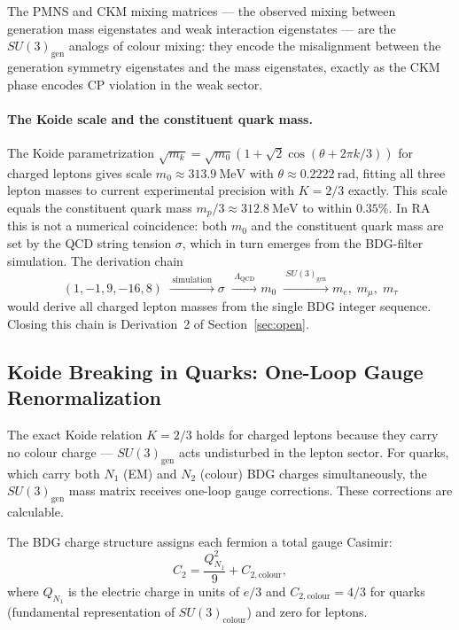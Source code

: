 \documentclass[11pt,a4paper]{article}
\begin{document}
The PMNS and CKM mixing matrices --- the observed mixing between generation
mass eigenstates and weak interaction eigenstates --- are the $SU(3)_{\mathrm{gen}}$
analogs of colour mixing: they encode the misalignment between the generation
symmetry eigenstates and the mass eigenstates, exactly as the CKM phase encodes
CP violation in the weak sector.

\paragraph{The Koide scale and the constituent quark mass.}
The Koide parametrization $\sqrt{m_k} = \sqrt{m_0}(1 + \sqrt{2}\cos(\theta +
2\pi k/3))$ for charged leptons gives scale $m_0 \approx 313.9~\mathrm{MeV}$
with $\theta \approx 0.2222~\mathrm{rad}$, fitting all three lepton masses
to current experimental precision with $K = 2/3$ exactly.
This scale equals the constituent quark mass $m_p/3 \approx 312.8~\mathrm{MeV}$
to within $0.35\%$. In RA this is not a numerical coincidence: both $m_0$
and the constituent quark mass are set by the QCD string tension $\sigma$,
which in turn emerges from the BDG-filter simulation. The derivation chain
\begin{equation}
  (1,{-1},9,{-16},8)
  \;\xrightarrow{\;\mathrm{simulation}\;}
  \sigma
  \;\xrightarrow{\;\Lambda_{\mathrm{QCD}}\;}
  m_0
  \;\xrightarrow{\;SU(3)_{\mathrm{gen}}\;}
  m_e,\;m_\mu,\;m_\tau
  \label{eq:mass_chain}
\end{equation}
would derive all charged lepton masses from the single BDG integer sequence.
Closing this chain is Derivation~2 of Section~\ref{sec:open}.

\subsection{Koide Breaking in Quarks: One-Loop Gauge Renormalization}
\label{sec:koide_breaking}

The exact Koide relation $K = 2/3$ holds for charged leptons because they
carry no colour charge --- $SU(3)_{\mathrm{gen}}$ acts undisturbed in the
lepton sector. For quarks, which carry both $N_1$ (EM) and $N_2$ (colour)
BDG charges simultaneously, the $SU(3)_{\mathrm{gen}}$ mass matrix receives
one-loop gauge corrections. These corrections are calculable.

The BDG charge structure assigns each fermion a total gauge Casimir:
\begin{equation}
  C_2 = \frac{Q_{N_1}^2}{9} + C_{2,\mathrm{colour}},
  \label{eq:C2_total}
\end{equation}
where $Q_{N_1}$ is the electric charge in units of $e/3$ and
$C_{2,\mathrm{colour}} = 4/3$ for quarks (fundamental representation of
$SU(3)_{\mathrm{colour}}$) and zero for leptons.
\end{document}
